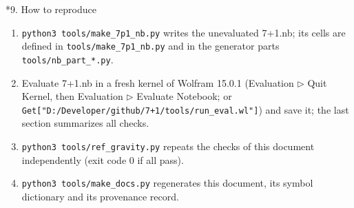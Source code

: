 \documentclass[10pt,a4paper]{article}
\makeatletter
\renewcommand\section{\@startsection{section}{1}{\z@}{-3.5ex \@plus -1ex \@minus -.2ex}{2.3ex \@plus.2ex}{\normalfont\Large\bfseries\raggedright}}
\makeatother
\begin{document}
\section*{9. How to reproduce}
\begin{enumerate}
\item \texttt{python3 tools/\allowbreak{}make\_\allowbreak{}7p1\_\allowbreak{}nb.py} writes the unevaluated 7+1.nb; its cells are defined in \texttt{tools/\allowbreak{}make\_\allowbreak{}7p1\_\allowbreak{}nb.py} and in the generator parts \texttt{tools/\allowbreak{}nb\_\allowbreak{}part\_\allowbreak{}*.py}.
\item Evaluate 7+1.nb in a fresh kernel of Wolfram 15.0.1 (Evaluation \texorpdfstring{\ensuremath{\triangleright}}{▸} Quit Kernel, then Evaluation \texorpdfstring{\ensuremath{\triangleright}}{▸} Evaluate Notebook; or \texttt{Get["D:/\allowbreak{}Developer/\allowbreak{}github/\allowbreak{}7+1/\allowbreak{}tools/\allowbreak{}run\_\allowbreak{}eval.wl"]}) and save it; the last section summarizes all checks.
\item \texttt{python3 tools/\allowbreak{}ref\_\allowbreak{}gravity.py} repeats the checks of this document independently (exit code 0 if all pass).
\item \texttt{python3 tools/\allowbreak{}make\_\allowbreak{}docs.py} regenerates this document, its symbol dictionary and its provenance record.
\end{enumerate}
\end{document}
